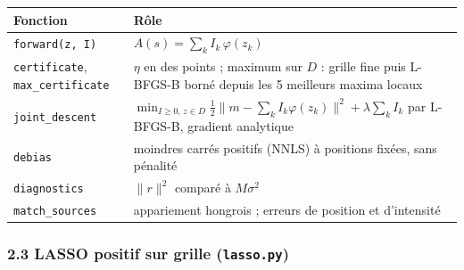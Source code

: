\documentclass[
  french,
]{article}
\newcounter{none} %
\begin{document}
{\def\LTcaptype{none} %
\begin{longtable}[]{@{}
  >{\raggedright\arraybackslash}p{}
  >{\raggedright\arraybackslash}p{}@{}}
\toprule\noalign{}
\begin{minipage}[b]{\linewidth}\raggedright
Fonction
\end{minipage} & \begin{minipage}[b]{\linewidth}\raggedright
Rôle
\end{minipage} \\
\midrule\noalign{}
\endhead
\bottomrule\noalign{}
\endlastfoot
\texttt{forward(z,\ I)} & \(A(s) = \sum_k I_k\,\varphi(z_k)\) \\
\texttt{certificate}, \texttt{max\_certificate} & \(\eta\) en des points
; maximum sur \(D\) : grille fine puis L-BFGS-B borné depuis les 5
meilleurs maxima locaux \\
\texttt{joint\_descent} &
\(\min_{I\ge 0,\,z\in D}\tfrac12\lVert m-\sum_k I_k\varphi(z_k)\rVert^2+\lambda\sum_k I_k\)
par L-BFGS-B, gradient analytique \\
\texttt{debias} & moindres carrés positifs (NNLS) à positions fixées,
sans pénalité \\
\texttt{diagnostics} & \(\lVert r\rVert^2\) comparé à \(M\sigma^2\) \\
\texttt{match\_sources} & appariement hongrois ; erreurs de position et
d'intensité \\
\end{longtable}
}

\subsubsection{\texorpdfstring{2.3 LASSO positif sur grille
(\texttt{lasso.py})}{2.3 LASSO positif sur grille (lasso.py)}}\label{lasso-positif-sur-grille-lasso.py}
\end{document}
